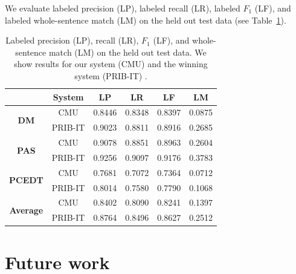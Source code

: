 \documentclass[11pt]{article}
\begin{document}
We evaluate labeled precision (LP), labeled recall (LR), labeled $F_1$ (LF), and
labeled whole-sentence match (LM) on the held out test data (see
Table~\ref{table:perf}).

% 
% 
% 
% 

% 
% 


\begin{table}
\begin{center}
\begin{tabular*}{\textwidth}%
{@{\extracolsep{\fill}}cc|cccc}%
 & System & LP & LR & LF & LM \\
\hline
\hline
\multirow{2}{*}{\textbf{DM}}
& CMU & 0.8446 & 0.8348 & 0.8397 & 0.0875 \\
& PRIB-IT & 0.9023 & 0.8811 & 0.8916 & 0.2685 \\
\hline
\multirow{2}{*}{\textbf{PAS}}
& CMU & 0.9078 & 0.8851 & 0.8963 & 0.2604 \\
& PRIB-IT & 0.9256 & 0.9097 & 0.9176 & 0.3783 \\
\hline
\multirow{2}{*}{\textbf{PCEDT}}
& CMU & 0.7681 & 0.7072 & 0.7364 & 0.0712 \\
& PRIB-IT & 0.8014 & 0.7580 & 0.7790 & 0.1068 \\
\hline
\hline
\multirow{2}{*}{\textbf{Average}}
& CMU & 0.8402 & 0.8090 & 0.8241 & 0.1397 \\
& PRIB-IT & 0.8764 & 0.8496 & 0.8627 & 0.2512 \\
\end{tabular*}
\caption{Labeled precision (LP), recall (LR), $F_1$ (LF), and
whole-sentence match (LM) on the held out test data.
We show results for our system (CMU) and the winning system (PRIB-IT)
\cite{martins_prib_2014}.}
\label{table:perf}
\end{center}
\end{table}



\section{Future work}
\end{document}
